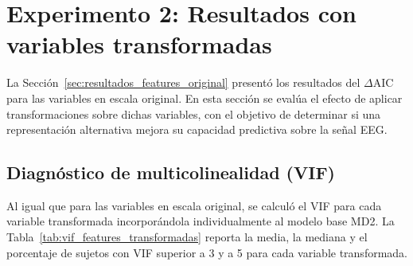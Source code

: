 \section{Experimento 2: Resultados con variables transformadas}
\label{sec:resultados_features_transformadas}

La Sección~\ref{sec:resultados_features_original} presentó los resultados del $\Delta$AIC 
para las variables en escala original. En esta sección se evalúa el efecto 
de aplicar transformaciones sobre dichas variables, con el objetivo de 
determinar si una representación alternativa mejora su capacidad predictiva 
sobre la señal EEG. 

\subsection{Diagnóstico de multicolinealidad (VIF)}

Al igual que para las variables en escala original, se calculó el VIF 
para cada variable transformada incorporándola individualmente al modelo 
base MD2. La Tabla~\ref{tab:vif_features_transformadas} reporta la 
media, la mediana y el porcentaje de sujetos con VIF superior a 3 y 
a 5 para cada variable transformada.

